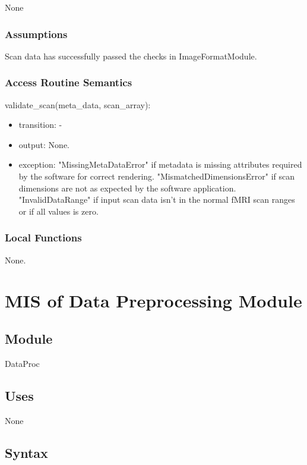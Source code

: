 \documentclass[12pt, titlepage]{article}
\begin{document}
None

\subsubsection{Assumptions}
Scan data has successfully passed the checks in ImageFormatModule.

\subsubsection{Access Routine Semantics}

\noindent validate\_scan(meta\_data, scan\_array):
\begin{itemize}
  \item transition: -
  \item output: None.
  \item exception: "MissingMetaDataError" if metadata is missing attributes required by the software
        for correct rendering. "MismatchedDimensionsError" if scan dimensions are not as expected by the software application.
        "InvalidDataRange" if input scan data isn't in the normal fMRI scan ranges or if all values is zero.

\end{itemize}



\subsubsection{Local Functions}

None.

\newpage

\section{MIS of Data Preprocessing Module} \label{DP}


\subsection{Module}

DataProc

\subsection{Uses}
None

\subsection{Syntax}
\end{document}
